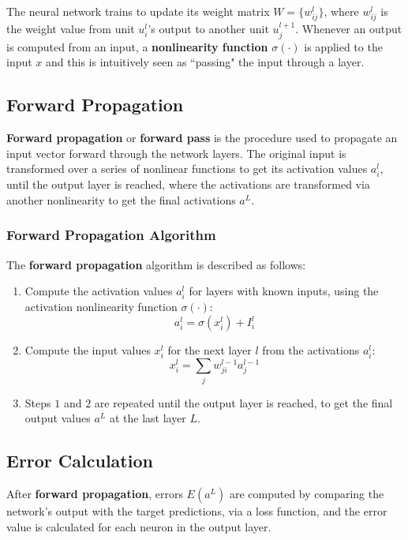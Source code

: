 The neural network trains to update its weight matrix $W = \Big \{ w_{ij}^l \Big \}$, where $w_{ij}^l$ is the weight value from unit $u_i^l$'s output to another unit $u_j^{l+1}$. Whenever an output is computed from an input, a \textbf{nonlinearity function} $\sigma(\cdot)$ is applied to the input $x$ and this is intuitively seen as ``passing" the input through a layer.


\subsection{Forward Propagation} \label{sec:ForwardProp}

\textbf{Forward propagation} or \textbf{forward pass} is the procedure used to propagate an input vector forward through the network layers. The original input is transformed over a series of nonlinear functions to get its activation values $a_i^l$, until the output layer is reached, where the activations are transformed via another nonlinearity to get the final activations $a^L$. 

\subsubsection{Forward Propagation Algorithm}

The \textbf{forward propagation} algorithm is described as follows: 

\begin{enumerate}
    \item Compute the activation values $a_i^l$ for layers with known inputs, using the activation nonlinearity function $\sigma(\cdot)$: 
    $$
    a_i^l = \sigma(x_i^l) + I_i^l
    $$
    
    \item Compute the input values $x_i^l$ for the next layer $l$ from the activations $a_i^l$: 
    $$
    x_i^l = \sum_j w_{ji}^{l-1} a_j^{l-1}
    $$
    
    \item Steps $1$ and $2$ are repeated until the output layer is reached, to get the final output values $a^L$ at the last layer $L$.
\end{enumerate}


\subsection{Error Calculation} \label{sec:ErrorCalc}

After \textbf{forward propagation}, errors $E(a^L)$ are computed by comparing the network's output with the target predictions, via a loss function, and the error value is calculated for each neuron in the output layer. 

